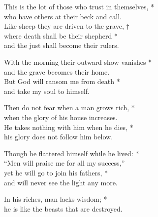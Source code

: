 
This is the lot of those who trust in themselves, *\\
who have others at their beck and call.\\
Like sheep they are driven to the grave, †\\
where death shall be their shepherd *\\
and the just shall become their rulers.

With the morning their outward show vanishes *\\
and the grave becomes their home.\\
But God will ransom me from death *\\
and take my soul to himself.

Then do not fear when a man grows rich, *\\
when the glory of his house increases.\\
He takes nothing with him when he dies, *\\
his glory does not follow him below.

Though he flattered himself while he lived: *\\
“Men will praise me for all my success,”\\
yet he will go to join his fathers, *\\
and will never see the light any more.

In his riches, man lacks wisdom; *\\
he is like the beasts that are destroyed.
